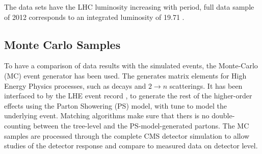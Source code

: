 The data sets have the LHC luminosity increasing with period, full data sample of 2012 corresponds to an integrated luminosity of 19.71 \fbinv. 

\subsection{Monte Carlo Samples}
To have a comparison of data results with the simulated events, the \MadGraphF \cite{Alwall:2011uj} Monte-Carlo (MC) event generator has been used. The \MadGraphF generates matrix elements for High Energy Physics processes, such as decays and $2 \rightarrow n$ scatterings. It has been interfaced to \PYTHIAS \cite{Sjostrand:2006za} by the LHE event record \cite{Alwall:2006yp}, to generate the rest of the higher-order effects using the Parton Showering (PS) model, with tune \Ztwostar to model the underlying event. Matching algorithms make sure that thers is no double-counting between the tree-level and the PS-model-generated partons. The MC samples are processed through the complete CMS detector simulation to allow studies of the detector response and compare to measured data on detector level.

